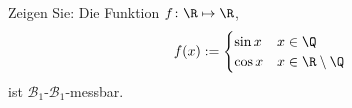     \begin{prob}
%
Zeigen Sie: Die Funktion $f \colon \R \mapsto \R$,
%
\[ f(x) :=
\begin{cases}
	\sin x & x \in \Q \\
	\cos x & x \in \R \setminus \Q
\end{cases}
\]
%
ist $\mathcal{B}_1$-$\mathcal{B}_1$-messbar.

\vspace{2mm}
\end{prob}
